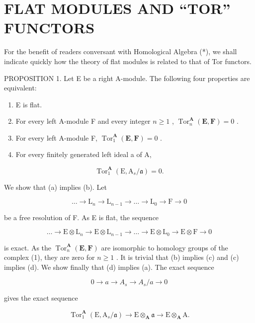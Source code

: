 \section{FLAT MODULES AND ``TOR'' FUNCTORS}

For the benefit of readers conversant with Homological Algebra (*), we shall indicate quickly how the theory of flat modules is related to that of Tor functors.

PROPOSITION 1. Let E be a right A-module. The following four properties are equivalent:

\begin{enumerate}
\def\labelenumi{(\alph{enumi})}
\item
  E is flat.
\item
  For every left A-module F and every integer \(n \geqslant 1\) , \(\operatorname{Tor}_n^{\mathbf{A}}(\mathbf{E}, \mathbf{F}) = 0\) .
\item
  For every left A-module F, \(\operatorname{Tor}_{1}^{\mathbf{A}}(\mathbf{E},\mathbf{F}) = 0\) .
\item
  For every finitely generated left ideal a of A,
\end{enumerate}

\[
\operatorname{Tor} _ {1} ^ {\mathbf {A}} (\mathrm{E}, \mathrm{A} _ {s} / \mathfrak {a}) = 0.
\]

We show that (a) implies (b). Let

\[
\dots \rightarrow \mathrm{L} _ {n} \rightarrow \mathrm{L} _ {n - 1} \rightarrow \dots \rightarrow \mathrm{L} _ {0} \rightarrow \mathrm{F} \rightarrow 0
\]

be a free resolution of F. As E is flat, the sequence

\[
\dots \rightarrow \mathrm{E} \otimes \mathrm{L} _ {n} \rightarrow \mathrm{E} \otimes \mathrm{L} _ {n - 1} \rightarrow \dots \rightarrow \mathrm{E} \otimes \mathrm{L} _ {0} \rightarrow \mathrm{E} \otimes \mathrm{F} \rightarrow 0\tag{1}
\]

is exact. As the \(\operatorname{Tor}_n^{\mathbf{A}}(\mathbf{E},\mathbf{F})\) are isomorphic to homology groups of the complex (1), they are zero for \(n\geqslant 1\) . It is trivial that (b) implies (c) and (c) implies (d). We show finally that (d) implies (a). The exact sequence

\[
0 \rightarrow a \rightarrow A _ {s} \rightarrow A _ {s} / a \rightarrow 0
\]

gives the exact sequence

\[
\operatorname{Tor} _ {1} ^ {\mathbf {A}} (\mathrm{E}, \mathrm{A} _ {s} / \mathfrak {a}) \rightarrow \mathrm{E} \otimes_ {\mathbf {A}} \mathfrak {a} \rightarrow \mathrm{E} \otimes_ {\mathbf {A}} \mathrm{A}.
\]

